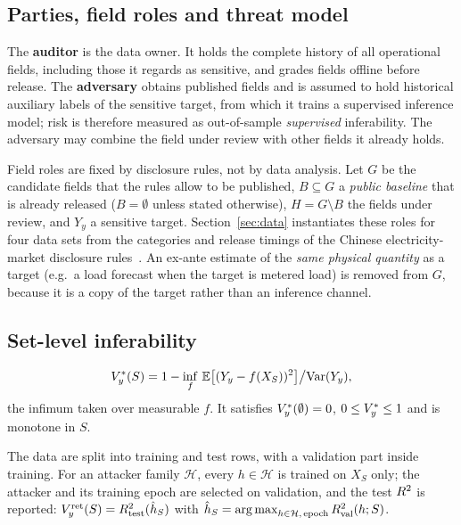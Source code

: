 \subsection{Parties, field roles and threat model}
The \textbf{auditor} is the data owner. It holds the complete history of all operational
fields, including those it regards as sensitive, and grades fields offline before release.
The \textbf{adversary} obtains published fields and is assumed to hold historical auxiliary
labels of the sensitive target, from which it trains a supervised inference model; risk is
therefore measured as out-of-sample \emph{supervised} inferability. The adversary may combine
the field under review with other fields it already holds.

Field roles are fixed by disclosure rules, not by data analysis. Let $G$ be the candidate
fields that the rules allow to be published, $B\subseteq G$ a \emph{public baseline} that is
already released ($B=\emptyset$ unless stated otherwise), $H=G\setminus B$ the fields under
review, and $Y_y$ a sensitive target. Section~\ref{sec:data} instantiates these roles for
four data sets from the categories and release timings of the Chinese electricity-market
disclosure rules~\cite{nea2024disclosure}. An ex-ante estimate of the \emph{same physical
quantity} as a target (e.g.\ a load forecast when the target is metered load) is removed from
$G$, because it is a copy of the target rather than an inference channel.

\subsection{Set-level inferability}
\begin{definition}
\[
V_{y}^{*}(S) = 1 - \inf_{f}\,\mathbb{E}\big[(Y_y - f(X_S))^{2}\big] \big/ \mathrm{Var}(Y_y),
\]
the infimum taken over measurable $f$. It satisfies $V_{y}^{*}(\emptyset)=0$, $0 \le V_{y}^{*} \le 1$
and is monotone in $S$.
\end{definition}

\begin{definition}\label{def:vret}
The data are split into training and test rows, with a validation part inside training. For
an attacker family $\mathcal{H}$, every $h\in\mathcal{H}$ is trained on $X_S$ only; the
attacker and its training epoch are selected on validation, and the test $R^{2}$ is reported:
$V_{y}^{\mathrm{ret}}(S) = R^{2}_{\mathrm{test}}(\hat h_S)$ with
$\hat h_S = \operatorname*{arg\,max}_{h \in \mathcal{H},\,\mathrm{epoch}} R^{2}_{\mathrm{val}}(h;S)$.
\end{definition}

